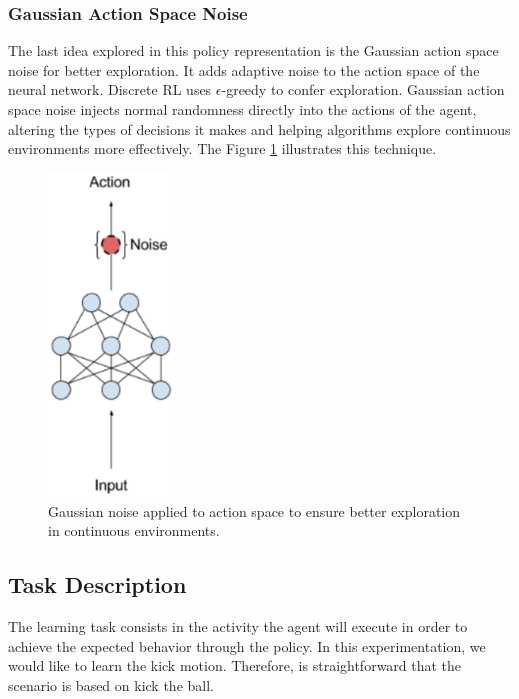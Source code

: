 \subsubsection{Gaussian Action Space Noise}\label{gasp}

The last idea explored in this policy representation is the Gaussian action space noise for better exploration. It adds adaptive noise to the action space of the neural network. Discrete RL uses $\epsilon$-greedy \cite{Watkins:1989} to confer exploration. Gaussian action space noise injects normal randomness directly into the actions of the agent, altering the types of decisions it makes and helping algorithms explore continuous environments more effectively. The Figure \ref{gaussiannoise} illustrates this technique.


\begin{figure}[!htbp]
	\centering
	\includegraphics[width=0.3\textwidth]{Cap5/gaussiannoise.eps}
	\caption{Gaussian noise applied to action space to ensure better exploration in continuous environments.
	\cite{parameternoiseblog}
	}
	\label{gaussiannoise}
\end{figure}

\subsection{Task Description}
The learning task consists in the activity the agent will execute in order to achieve the expected behavior through the policy. In this experimentation, we would like to learn the kick motion. Therefore, is straightforward that the scenario is based on kick the ball.

